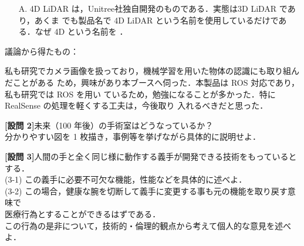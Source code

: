 \documentclass{jsarticle}
\begin{document}
\begin{itemize}
  \item [A.]4D LiDAR は，Unitree社独自開発のものである．実態は3D LiDAR であり，あくま
  \hspace*{5.5zw}でも製品名で 4D LiDAR という名前を使用しているだけである．なぜ 4D という名前を
 ．\\


  \newpage
  \vspace*{-10zh}

 


  
\end{itemize}

\hspace*{4.7zw}議論から得たもの：

\hspace*{5.7zw}私も研究でカメラ画像を扱っており，機械学習を用いた物体の認識にも取り組んだことがある
\hspace*{6.7zw}ため，興味があり本ブースへ伺った．本製品は ROS 対応であり，私も研究では ROS を用い
\hspace*{6.7zw}ているため，勉強になることが多かった．特に RealSense の処理を軽くする工夫は，今後取り
\hspace*{6.7zw}入れるべきだと思った．

\newpage

\textbf{{[設問 2]}}\hspace*{1zw}未来（100 年後）の手術室はどうなっているか？\\
\hspace*{5.7zw}分かりやすい図を 1 枚描き，事例等を挙げながら具体的に説明せよ．\\


\newpage

\textbf{{[設問 3]}}\hspace*{1zw}人間の手と全く同じ様に動作する義手が開発できる技術をもっているとする．\\
\hspace*{5.7zw}(3-1) この義手に必要不可欠な機能，性能などを具体的に述べよ．\\

\hspace*{4.7zw}(3-2) この場合，健康な腕を切断して義手に変更する事も元の機能を取り戻す意味で\\
\hspace*{8.4zw}医療行為とすることができるはずである．\\
\hspace*{8.4zw}この行為の是非について，技術的・倫理的観点から考えて個人的な意見を述べよ．\\
\end{document}
